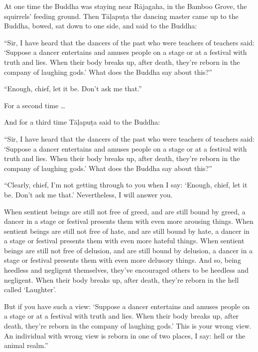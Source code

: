 \documentclass[12pt,openany]{book}%
\begin{document}
At one time the Buddha was staying near \textsanskrit{Rājagaha}, in the Bamboo Grove, the squirrels’ feeding ground. Then \textsanskrit{Tāḷapuṭa} the dancing master came up to the Buddha, bowed, sat down to one side, and said to the Buddha: 

“Sir, I have heard that the dancers of the past who were teachers of teachers said: ‘Suppose a dancer entertains and amuses people on a stage or at a festival with truth and lies. When their body breaks up, after death, they’re reborn in the company of laughing gods.’ What does the Buddha say about this?” 

“Enough, chief, let it be. Don’t ask me that.” 

For a second time … 

And for a third time \textsanskrit{Tāḷapuṭa} said to the Buddha: 

“Sir, I have heard that the dancers of the past who were teachers of teachers said: ‘Suppose a dancer entertains and amuses people on a stage or at a festival with truth and lies. When their body breaks up, after death, they’re reborn in the company of laughing gods.’ What does the Buddha say about this?” 

“Clearly, chief, I’m not getting through to you when I say: ‘Enough, chief, let it be. Don’t ask me that.’ Nevertheless, I will answer you. 

When sentient beings are still not free of greed, and are still bound by greed, a dancer in a stage or festival presents them with even more arousing things. When sentient beings are still not free of hate, and are still bound by hate, a dancer in a stage or festival presents them with even more hateful things. When sentient beings are still not free of delusion, and are still bound by delusion, a dancer in a stage or festival presents them with even more delusory things. And so, being heedless and negligent themselves, they’ve encouraged others to be heedless and negligent. When their body breaks up, after death, they’re reborn in the hell called ‘Laughter’. 

But if you have such a view: ‘Suppose a dancer entertains and amuses people on a stage or at a festival with truth and lies. When their body breaks up, after death, they’re reborn in the company of laughing gods.’ This is your wrong view. An individual with wrong view is reborn in one of two places, I say: hell or the animal realm.” 
\end{document}
